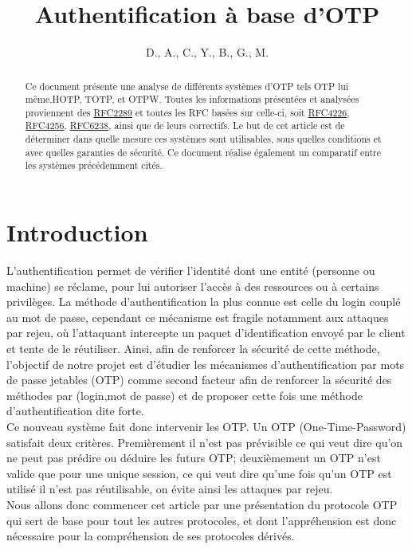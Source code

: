 \documentclass{../res/univ-projet}
\title{Authentification à base d'OTP}
\author{D.\bsc{Picard}, A.\bsc{Smondack}, C.\bsc{Hardouin}, Y.\bsc{Adegoloye}, B.\bsc{Zigh}, G.\bsc{Ferry}, M.\bsc{Michotte} }
\begin{document}
\maketitle

\begin{abstract}
Ce document présente une analyse de différents systèmes d'OTP tels \og{}OTP\fg{} lui même,\og{}HOTP\fg{}, \og{}TOTP\fg{},
et \og{}OTPW\fg{}. Toutes les informations présentées et analysées proviennent des \href{http://tools.ietf.org/html/rfc2289}{RFC2289} et 
toutes les RFC basées sur celle-ci, soit \href{http://tools.ietf.org/html/rfc4226}{RFC4226}, \href{http://tools.ietf.org/html/rfc4256}{RFC4256}, 
\href{http://tools.ietf.org/html/rfc6238}{RFC6238}, ainsi que de leurs correctifs. Le but de cet article est de déterminer dans quelle mesure 
ces systèmes sont utilisables, sous quelles conditions et avec quelles garanties de sécurité. Ce document réalise également un comparatif entre les 
systèmes précédemment cités.
\end{abstract}

\newpage
\tableofcontents
\newpage
\part{Introduction}
L'authentification permet de vérifier l'identité dont une entité (personne ou machine) se réclame, pour lui autoriser l'accès à des
ressources ou à certains privilèges. La méthode d'authentification la plus connue est celle du login couplé au mot de passe, cependant
ce mécanisme est fragile notamment aux attaques par rejeu, où l'attaquant intercepte un paquet d'identification envoyé par le client et tente de le réutiliser. Ainsi, afin de renforcer la sécurité de cette méthode, 
l'objectif de notre projet est d'étudier les mécanismes d'authentification par mots de passe jetables (OTP) comme second facteur afin de renforcer la sécurité
des méthodes par (login,mot de passe) et de proposer cette fois une méthode d'authentification dite forte.\\
Ce nouveau système fait donc intervenir les OTP. Un OTP (One-Time-Password) satisfait deux critères. Premièrement il n'est pas prévisible ce qui veut dire qu'on ne peut pas prédire 
ou déduire les futurs OTP; deuxièmement un OTP n'est valide que pour une unique session, ce qui veut dire qu'une fois qu'un OTP est utilisé il n'est pas réutilisable, on évite ainsi les
attaques par rejeu.\\
Nous allons donc commencer cet article par une présentation du protocole OTP qui sert de base pour tout les autres protocoles, et dont l'appréhension est donc nécessaire pour la compréhension
de ses protocoles dérivés.
\end{document}

